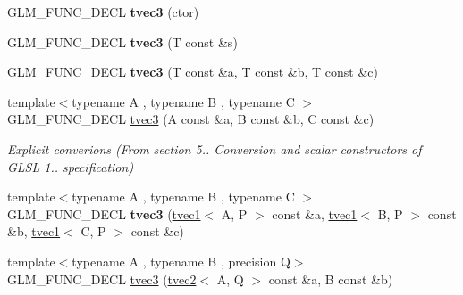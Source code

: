 \begin{DoxyCompactItemize}
\item 
\hypertarget{structglm_1_1tvec3_aff8d373dbcc5b03c6aef3092474489d0}{G\-L\-M\-\_\-\-F\-U\-N\-C\-\_\-\-D\-E\-C\-L {\bfseries tvec3} (ctor)}\label{structglm_1_1tvec3_aff8d373dbcc5b03c6aef3092474489d0}

\item 
\hypertarget{structglm_1_1tvec3_afffe271abececf5a99d21fe36150416b}{G\-L\-M\-\_\-\-F\-U\-N\-C\-\_\-\-D\-E\-C\-L {\bfseries tvec3} (T const \&s)}\label{structglm_1_1tvec3_afffe271abececf5a99d21fe36150416b}

\item 
\hypertarget{structglm_1_1tvec3_a9c3e064c51d3d9ee1cb5353348a99654}{G\-L\-M\-\_\-\-F\-U\-N\-C\-\_\-\-D\-E\-C\-L {\bfseries tvec3} (T const \&a, T const \&b, T const \&c)}\label{structglm_1_1tvec3_a9c3e064c51d3d9ee1cb5353348a99654}

\item 
\hypertarget{structglm_1_1tvec3_a0b681461de215371b4f8bacbf514bd40}{{\footnotesize template$<$typename A , typename B , typename C $>$ }\\G\-L\-M\-\_\-\-F\-U\-N\-C\-\_\-\-D\-E\-C\-L \hyperlink{structglm_1_1tvec3_a0b681461de215371b4f8bacbf514bd40}{tvec3} (A const \&a, B const \&b, C const \&c)}\label{structglm_1_1tvec3_a0b681461de215371b4f8bacbf514bd40}

\begin{DoxyCompactList}\small\item\em Explicit converions (From section 5.. Conversion and scalar constructors of G\-L\-S\-L 1.. specification) \end{DoxyCompactList}\item 
\hypertarget{structglm_1_1tvec3_aa785ff9b6da14ac85b793f0af36ff852}{{\footnotesize template$<$typename A , typename B , typename C $>$ }\\G\-L\-M\-\_\-\-F\-U\-N\-C\-\_\-\-D\-E\-C\-L {\bfseries tvec3} (\hyperlink{structglm_1_1tvec1}{tvec1}$<$ A, P $>$ const \&a, \hyperlink{structglm_1_1tvec1}{tvec1}$<$ B, P $>$ const \&b, \hyperlink{structglm_1_1tvec1}{tvec1}$<$ C, P $>$ const \&c)}\label{structglm_1_1tvec3_aa785ff9b6da14ac85b793f0af36ff852}

\item 
\hypertarget{structglm_1_1tvec3_ad2542f4353388c57283dd78e932853ba}{{\footnotesize template$<$typename A , typename B , precision Q$>$ }\\G\-L\-M\-\_\-\-F\-U\-N\-C\-\_\-\-D\-E\-C\-L \hyperlink{structglm_1_1tvec3_ad2542f4353388c57283dd78e932853ba}{tvec3} (\hyperlink{structglm_1_1tvec2}{tvec2}$<$ A, Q $>$ const \&a, B const \&b)}\label{structglm_1_1tvec3_ad2542f4353388c57283dd78e932853ba}


\end{DoxyCompactItemize}
